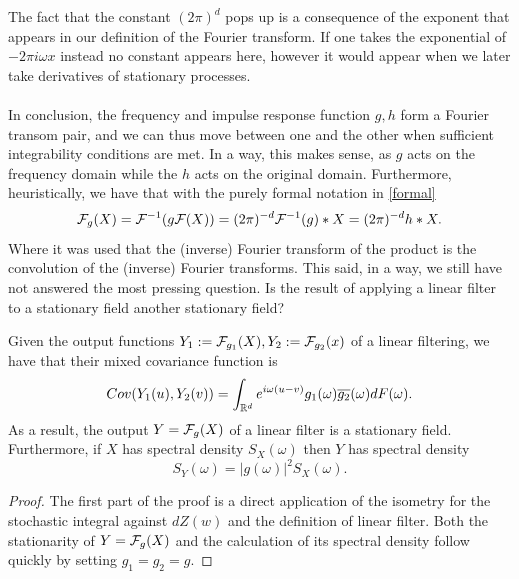 \documentclass[
    a4paper,
    DIV=14,
    abstract=true,
    numbers=noenddot
]{scrartcl}
\begin{document}
The fact that the constant $(2\pi)^d$ pops up is a consequence of the exponent that appears in our definition of the Fourier transform. If one takes the exponential of $-2\pi i\omega x$ instead no constant appears here, however it would appear when we later take derivatives of stationary processes.\\
\\
In conclusion, the frequency and impulse response function $g,h$ form a Fourier transom pair, and we can thus move between one and the other when sufficient integrability conditions are met. In a way, this makes sense, as $g$ acts on the frequency domain while the $h$ acts on the original domain. Furthermore, heuristically, we have that with the purely formal notation in \eqref{formal}
\begin{equation*}
	\mathcal{F}_g(X)=\mathcal{F}^{-1}(g\mathcal{F}(X))=(2\pi)^{-d}\mathcal{F}^{-1}(g)*X=(2\pi)^{-d}h*X.
\end{equation*}
Where it was used that the (inverse) Fourier transform of the product is the convolution of the (inverse) Fourier transforms.
This said,
in a way,  we still have not answered the most pressing question. Is the result of applying a linear filter to a stationary field another stationary field?

\begin{proposition}\label{dens linear filter}
	Given the output functions $Y_1:=\mathcal{F}_{g_1}(X),Y_2:=\mathcal{F}_{g_2}(x)$ of a linear filtering, we have that their mixed covariance function is
	\begin{equation*}
		Cov(Y_1(u),Y_2(v))=\int_{\mathbb{R}^d}e^{i\omega (u-v)}g_1(\omega)\overline{g_2}(\omega) dF(\omega)    .
	\end{equation*}
	As a result, the output $Y=\mathcal{F}_{g}(X)$ of a linear filter is a stationary field. Furthermore, if $X$ has spectral density  $S_X(\omega)$ then $Y$ has spectral density
	$$S_Y(\omega)=|g(\omega)|^2 S_X(\omega).$$
\end{proposition}
\begin{proof}
	The first part of the proof is a direct application of the isometry for the stochastic integral against $dZ(w)$ and the definition of linear filter. Both the stationarity of  $Y=\mathcal{F}_g(X)$ and the calculation of its spectral density follow quickly by setting $g_1=g_2=g$.
\end{proof}
\end{document}
